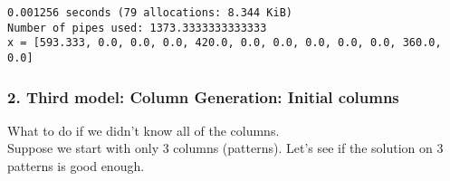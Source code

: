     
    \begin{Verbatim}[commandchars=\\\{\}]
  0.001256 seconds (79 allocations: 8.344 KiB)
Number of pipes used: 1373.3333333333333
x = [593.333, 0.0, 0.0, 0.0, 420.0, 0.0, 0.0, 0.0, 0.0, 0.0, 360.0, 0.0]

    \end{Verbatim}

    \hypertarget{column-generation-initial-columns}{%
\subsubsection{2. Third model: Column Generation: Initial
columns}\label{column-generation-initial-columns}}

What to do if we didn't know all of the columns.\\
Suppose we start with only 3 columns (patterns). Let's see if the
solution on 3 patterns is good enough.


